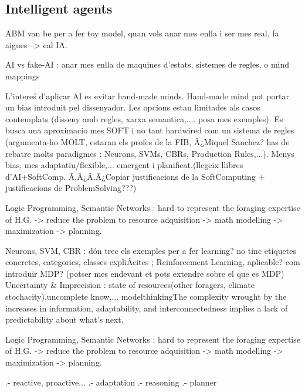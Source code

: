 \documentclass{report}
\begin{document}
\begin{enumeration}
\begin{end}
\subsection{Intelligent agents} %



ABM van be per a fer toy model, quan vols anar mes enlla i ser mes real, fa aigues --> cal IA.

AI vs fake-AI : anar mes enlla de maquines d'estats, sistemes de regles, o mind mappings

L'intere\'s d'aplicar AI es evitar hand-made minds. Hand-made mind pot portar un bias introduit pel dissenyador.
Les opcions estan limitades als casos contemplats (disseny amb regles, xarxa semantica,.... posa mes exemples).
Es busca una aproximacio mes SOFT i no tant hardwired com un sistema de regles (argumenta-ho MOLT,
estaran els profes de la FIB, Â¿Miquel Sanchez? has de rebatre molts paradigmes : Neurons, SVMs, CBRs, Production Rules,...). 
Menys bias, mes adaptatiu/flexible,... emergent i planificat.(llegeix llibres d'AI+SoftComp. Ã‚Â¿Ã‚Â¿Copiar justificacions de la SoftComputing + justificacions de ProblemSolving???)

Logic Programming, Semantic Networks : hard to represent the foraging expertise of H.G. -> reduce the problem to 
resource adquisition -> math modelling -> maximization -> planning.

Neurons, SVM, CBR : d\'on trec els exemples per a fer learning? no tinc etiquetes concretes, categories, classes expliÂ­cites ; Reinforcement Learning, aplicable? com introduir MDP? (potser mes endevant et pots extendre sobre el que es MDP)\\

Uncertainty \& Imprecision : state of resources(other foragers, climate stochacity),uncomplete know,... 
modelthinking{The complexity wrought by the increases in information, adaptability, and interconnectedness implies a lack of predictability about what's next}.

Logic Programming, Semantic Networks : hard to represent the foraging expertise of H.G. -> reduce the problem to 
resource adquisition -> math modelling -> maximization -> planning.

	  .- reactive, proactive...
	  .- adaptation
	  .- reasoning
	  .- planner


\end{end}
\end{enumeration}
\end{document}
